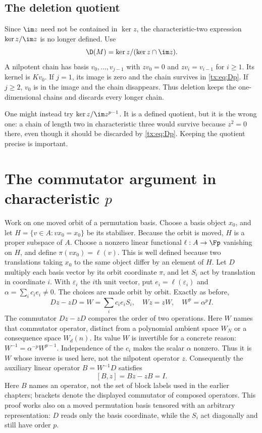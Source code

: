 \subsection{The deletion quotient}
Since $\im z$ need not be contained in $\ker z$, the characteristic-two expression $\ker z/\im z$ is no longer defined. Use
\begin{equation}\label{tx:eq:Dp}
\D(M)=\ker z/(\ker z\cap\im z).
\end{equation}
A nilpotent chain has basis $v_0,\ldots,v_{j-1}$ with $zv_0=0$ and $zv_i=v_{i-1}$ for $i\ge1$. Its kernel is $Kv_0$. If $j=1$, its image is zero and the chain survives in \eqref{tx:eq:Dp}. If $j\ge2$, $v_0$ is in the image and the chain disappears. Thus deletion keeps the one-dimensional chains and discards every longer chain.

One might instead try $\ker z/\im z^{p-1}$. It is a defined quotient, but it is the wrong one: a chain of length two in characteristic three would survive because $z^2=0$ there, even though it should be discarded by \eqref{tx:eq:Dp}. Keeping the quotient precise is important.

\section{The commutator argument in characteristic \texorpdfstring{$p$}{p}}\label{tx:sec:commutatorp}
Work on one moved orbit of a permutation basis. Choose a basis
object $x_0$, and let $H=\{v\in A:vx_0=x_0\}$ be its stabiliser.
Because the orbit is moved, $H$ is a proper subspace of $A$.
Choose a nonzero linear functional $\ell:A\to\Fp$ vanishing on
$H$, and define $\pi(vx_0)=\ell(v)$. This is well defined because
two translations taking $x_0$ to the same object differ by an
element of $H$. Let $D$ multiply each basis vector by its orbit
coordinate $\pi$, and let $S_i$ act by translation in coordinate
$i$. With $\varepsilon_i$ the $i$th unit vector, put
$e_i=\ell(\varepsilon_i)$ and $\alpha=\sum_i c_ie_i\ne0$.
The choices are made orbit by orbit. Exactly as before,
\[Dz-zD=W=\sum_i c_ie_iS_i,\quad Wz=zW,\quad W^p=\alpha^pI.
\]
The commutator $Dz-zD$ compares the order of two operations.
Here $W$ names that commutator operator, distinct from a polynomial
ambient space $W_N$ or a consequence space $W_d(n)$.
Its value $W$ is invertible for a concrete reason:
$W^{-1}=\alpha^{-p}W^{p-1}$. Independence of the $c_i$ makes the
scalar $\alpha$ nonzero. Thus it is $W$ whose inverse is used here,
not the nilpotent operator $z$.
Consequently the auxiliary linear operator $B=W^{-1}D$ satisfies
\begin{equation}\label{tx:eq:commutator}[B,z]=Bz-zB=I.\end{equation}
Here $B$ names an operator, not the set of block labels used in the
earlier chapters; brackets denote the displayed commutator of
composed operators.
This proof works also on a moved permutation basis tensored with an arbitrary representation: $D$ reads only the basis coordinate, while the $S_i$ act diagonally and still have order $p$.

